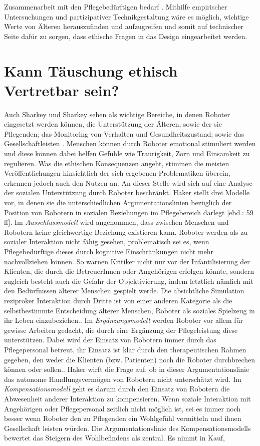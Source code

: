Zusammenarbeit mit den Pflegebedürftigen bedarf \cite{sharky}\cite{kehl}. Mithilfe empirischer Untersuchungen und partizipativer Technikgestaltung wäre es möglich, wichtige Werte von Älteren herauszufinden und aufzugreifen und somit auf technischer Seite dafür zu sorgen, dass ethische Fragen in das Design eingearbeitet werden.

\section{Kann Täuschung ethisch Vertretbar sein?}
\label{sec:täuschung}
Auch Sharkey und Sharkey sehen als wichtige Bereiche, in denen Roboter eingesetzt werden können, die Unterstützung der Älteren, sowie der sie Pflegenden; das Monitoring von Verhalten und Gesundheitszustand; sowie das Gesellschaftleisten \cite[21]{sharky}. Menschen können durch Roboter emotional stimuliert werden und diese können dabei helfen \glqq Gefühle wie Traurigkeit, Zorn und Einsamkeit zu regulieren\grqq \cite[58]{haker}. Was die ethischen Konsequenzen angeht, stimmen die meisten Veröffentlichungen hinsichtlich der sich ergebenen Problematiken überein, erkennen jedoch auch den Nutzen an. An dieser Stelle wird sich auf eine Analyse der sozialen Unterstützung durch Roboter beschränkt. Haker stellt drei Modelle vor, in denen sie die unterschiedlichen Argumentationslinien bezüglich der Position von Robotern in sozialen Beziehungen im Pflegebereich darlegt [ebd.: 59 ff]. Im \textit{Ausschlussmodell} wird angenommen, dass zwischen Menschen und Robotern keine gleichwertige Beziehung existieren kann. Roboter werden als zu sozialer Interaktion nicht fähig gesehen, problematisch sei es, wenn Pflegebedürftige dieses durch kognitive Einschränkungen nicht mehr nachvollziehen können. \glqq [. . . ] So warnen Kritiker nicht nur vor der Infantilisierung der Klienten, die durch die BetreuerInnen oder Angehörigen erfolgen könnte, sondern zugleich besteht auch die Gefahr der Objektivierung, indem letztlich nämlich mit den Bedürfnissen älterer Menschen gespielt werde. Die absichtliche Simulation reziproker Interaktion durch Dritte ist von einer anderen Kategorie als die selbstbestimmte Entscheidung älterer Menschen, Roboter als soziales Spielzeug in ihr Leben einzubeziehen.\grqq [ebd.: 60]. Im \textit{Ergänzungsmodell} werden Roboter vor allem für gewisse Arbeiten gedacht, die durch eine Ergänzung der Pflegeleistung diese unterstützen. Dabei wird der Einsatz von Robotern immer durch das Pflegepersonal betreut, \glqq [. . . ] ihr Einsatz ist klar durch den therapeutischen Rahmen gegeben, den weder die Klienten (bzw. Patienten) noch die Roboter durchbrechen können oder sollen.\grqq [ebd.: 61]. Haker wirft die Frage auf, ob in dieser Argumentationslinie das autonome Handlungsvermögen von Robotern nicht unterschätzt wird. Im \textit{Kompensationsmodell} geht es darum durch den Einsatz von Robotern die Abwesenheit anderer Interaktion zu kompensieren. Wenn soziale Interaktion mit Angehörigen oder Pflegepersonal zeitlich nicht möglich ist, sei es immer noch besser wenn Roboter den zu Pflegenden ein Wohlgefühl vermitteln und ihnen Gesellschaft leisten würden. Die Argumentationslinie des Kompensationsmodells bewertet das Steigern des Wohlbefindens als zentral. Es nimmt in Kauf, 
